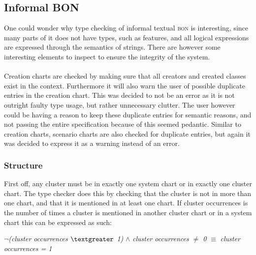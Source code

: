 \subsection{Informal BON}
One could wonder why type checking of informal textual \textsc{bon} is interesting, since many parts of it does not have types, such as features, and all logical expressions are expressed through the semantics of strings. There are however some interesting elements to inspect to ensure the integrity of the system.

\paragraph{}
Creation charts are checked by making sure that all creators and created classes exist in the context. Furthermore it will also warn the user of possible duplicate entries in the creation chart. This was decided to not be an error as it is not outright faulty type usage, but rather unnecessary clutter. The user however could be having a reason to keep these duplicate entries for semantic reasons, and not passing the entire specification because of this seemed pedantic. Similar to creation charts, scenario charts are also checked for duplicate entries, but again it was decided to express it as a warning instead of an error. 

\subsubsection{Structure}
\label{implementation-informal-structure}
First off, any cluster must be in exactly one system chart or in exactly one cluster chart. The type checker does this by checking that the cluster is not in more than one chart, and that it is mentioned in at least one chart. If cluster occurrences is the number of times a cluster is mentioned in another cluster chart or in a system chart this can be expressed as such: 
{\footnotesize\begin{center} $\neg$\textit{(cluster occurrences $\textgreater$ 1)} $\wedge$ \textit{cluster occurrences $\neq$ 0} \textit{} $\equiv$  \textit{cluster occurrences = 1}
\end{center}}
